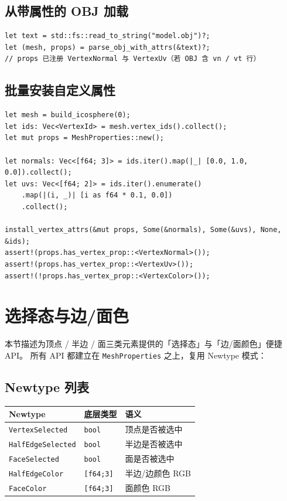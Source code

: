 \documentclass[11pt,a4paper]{article}
\begin{document}
\subsection{从带属性的 OBJ 加载}

\begin{lstlisting}
let text = std::fs::read_to_string("model.obj")?;
let (mesh, props) = parse_obj_with_attrs(&text)?;
// props 已注册 VertexNormal 与 VertexUv（若 OBJ 含 vn / vt 行）
\end{lstlisting}

\subsection{批量安装自定义属性}

\begin{lstlisting}
let mesh = build_icosphere(0);
let ids: Vec<VertexId> = mesh.vertex_ids().collect();
let mut props = MeshProperties::new();

let normals: Vec<[f64; 3]> = ids.iter().map(|_| [0.0, 1.0, 0.0]).collect();
let uvs: Vec<[f64; 2]> = ids.iter().enumerate()
    .map(|(i, _)| [i as f64 * 0.1, 0.0])
    .collect();

install_vertex_attrs(&mut props, Some(&normals), Some(&uvs), None, &ids);
assert!(props.has_vertex_prop::<VertexNormal>());
assert!(props.has_vertex_prop::<VertexUv>());
assert!(!props.has_vertex_prop::<VertexColor>());
\end{lstlisting}

\section{选择态与边/面色}
\label{sec:selection-color}

本节描述为顶点 / 半边 / 面三类元素提供的「选择态」与「边/面颜色」便捷 API。
所有 API 都建立在 \texttt{MeshProperties} 之上，复用 Newtype 模式：

\subsection{Newtype 列表}

\begin{center}
\renewcommand{\arraystretch}{1.18}
\begin{tabular}{@{}lll@{}}
  \toprule
  \textbf{Newtype} & \textbf{底层类型} & \textbf{语义} \\
  \midrule
  \texttt{VertexSelected}   & \texttt{bool}    & 顶点是否被选中 \\
  \texttt{HalfEdgeSelected} & \texttt{bool}    & 半边是否被选中 \\
  \texttt{FaceSelected}     & \texttt{bool}    & 面是否被选中 \\
  \texttt{HalfEdgeColor}    & \texttt{[f64;3]} & 半边/边颜色 RGB \\
  \texttt{FaceColor}        & \texttt{[f64;3]} & 面颜色 RGB \\
  \bottomrule
\end{tabular}
\end{center}
\end{document}
